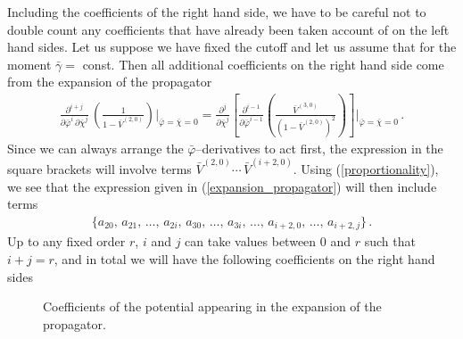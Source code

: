 \documentclass[11pt,draft]{book} %
\begin{document}
Including the coefficients of the right hand side,
we have to be careful not to double count any coefficients that have already been taken account of on the
left hand sides. Let us suppose we have fixed the cutoff and let us assume that for the
moment $\bar{\gamma} =$ const. Then all additional coefficients on the right hand side come from the
expansion of the propagator
\begin{align}
  \label{expansion_propagator}
  \frac{\partial^{i+j}}{\partial \bar\varphi^i \, \partial \bar\chi^j} \, \left( \frac{1}{1 - \bar V^{(2,0)}} \right) \bigg|_{\bar\varphi = \bar\chi = 0} =
  \frac{\partial^{j}}{\partial \bar\chi^j} \left[ \frac{\partial^{i-1}}{\partial \bar\varphi^{i-1}} \left( \frac{\bar V^{(3,0)}}{(1 - \bar V^{(2,0)})^2} \right) \right] \Bigg|_{\bar\varphi = \bar\chi = 0}\, .
\end{align}
Since we can always arrange the $\bar\varphi$--derivatives to act first,
the expression in the square brackets will involve terms $\bar V^{(2,0)} \cdots \, \bar V^{(i+2,0)}$.
Using (\ref{proportionality}), we see that the expression given in (\ref{expansion_propagator}) will
then include terms
\begin{align}
  \bigg\lbrace
  a_{20},\, a_{21},\, \dots ,\, a_{2i},\, a_{30},\, \dots ,\, a_{3i},\, \dots,\, a_{i+2,0},\, \dots,\, a_{i+2,j}
  \bigg\rbrace \,.
\end{align}
Up to any fixed order $r$, $i$ and $j$ can take values between $0$ and $r$ such that $i+j = r$,
and in total we will have the following coefficients on the right hand sides
\begin{figure}
\centering
{}
\caption{Coefficients of the potential appearing in the expansion of the propagator.}
\label{diag_rhs}
\end{figure}
\end{document}
